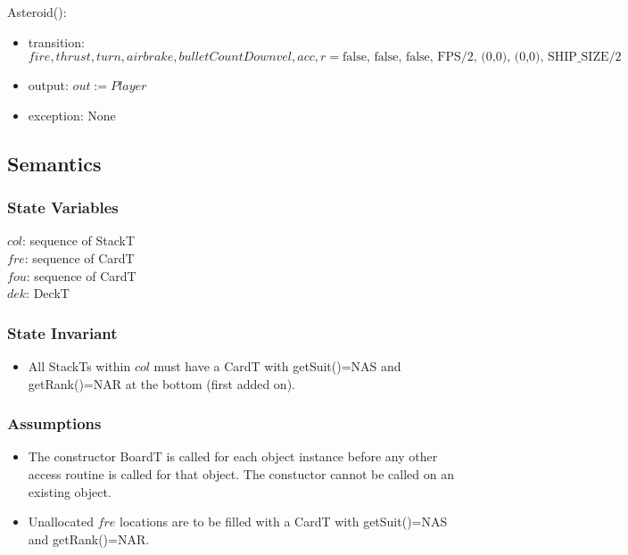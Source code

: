 \documentclass[12pt]{article}
\newcommand{\m}[1]{\mbox{#1}}
\begin{document}
Asteroid():
\begin{itemize}
    \item transition: $ fire, thrust, turn, airbrake, bulletCountDown vel, acc, r = \mbox{false, false, false, FPS/2, (0,0), (0,0), SHIP_SIZE/2 }$
    \item output: $out := Player$
    \item exception: None
\end{itemize}




\subsection* {Semantics}

\subsubsection* {State Variables}

$col$: sequence of StackT\\
$fre$: sequence of CardT\\
$fou$: sequence of CardT\\
$dek$: DeckT\\

\subsubsection* {State Invariant}

\begin{itemize}
  \item All StackTs within $col$ must have a CardT with getSuit()=\m{NAS}
  and getRank()=\m{NAR} at the bottom (first added on).
\end{itemize}

\subsubsection* {Assumptions}

\begin{itemize}
    \item The constructor BoardT is called for each object instance
    before any other access routine is called for that object. The
    constuctor cannot be called on an existing object.
    \item Unallocated $fre$ locations are to be filled with a CardT with
    getSuit()=\m{NAS} and getRank()=\m{NAR}.
\end{itemize}
\end{document}
